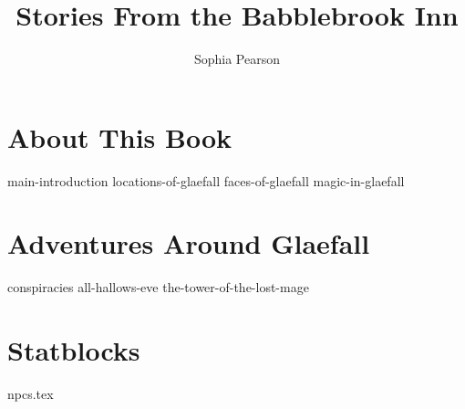 \documentclass[10pt,twoside,openany,nodeprecatedcode,justified,bg=print]{dndbook}
\title{Stories From the Babblebrook Inn}
\author{Sophia Pearson}
\begin{document}
\frontmatter

\maketitle


\tableofcontents

\mainmatter

\part{About This Book}

{main-introduction}
{locations-of-glaefall}
{faces-of-glaefall}
{magic-in-glaefall}

\part{Adventures Around Glaefall}

{conspiracies}
{all-hallows-eve}
{the-tower-of-the-lost-mage}

\part{Statblocks}

{npcs.tex}
\end{document}
